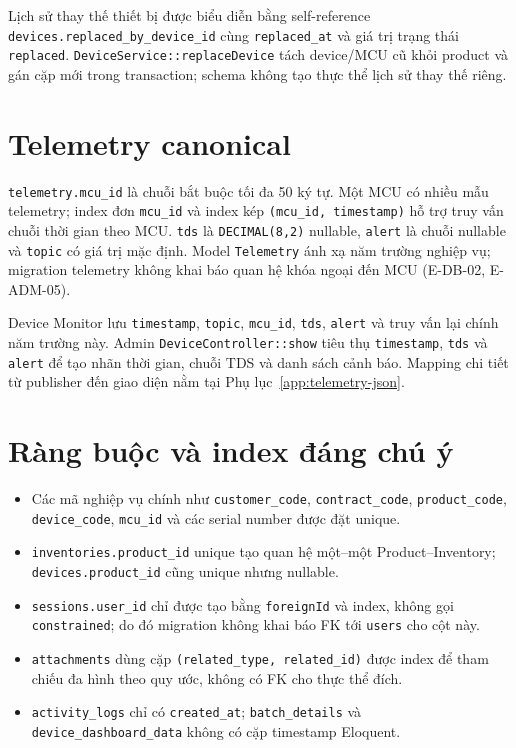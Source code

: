 Lịch sử thay thế thiết bị được biểu diễn bằng self-reference
\texttt{devices.replaced\_by\_device\_id} cùng \texttt{replaced\_at} và giá trị
trạng thái \texttt{replaced}. \texttt{DeviceService::replaceDevice} tách device/MCU cũ
khỏi product và gán cặp mới trong transaction; schema không tạo thực thể
lịch sử thay thế riêng.

\section{Telemetry canonical}

\texttt{telemetry.mcu\_id} là chuỗi bắt buộc tối đa 50 ký tự. Một MCU có
nhiều mẫu telemetry; index đơn \texttt{mcu\_id} và index kép
\texttt{(mcu\_id, timestamp)} hỗ trợ truy vấn chuỗi thời gian theo MCU.
\texttt{tds} là \texttt{DECIMAL(8,2)} nullable, \texttt{alert} là chuỗi
nullable và \texttt{topic} có giá trị mặc định. Model \texttt{Telemetry}
ánh xạ năm trường nghiệp vụ; migration telemetry không khai báo quan hệ khóa
ngoại đến MCU (E-DB-02, E-ADM-05).

Device Monitor lưu \texttt{timestamp}, \texttt{topic}, \texttt{mcu\_id},
\texttt{tds}, \texttt{alert} và truy vấn lại chính năm trường này.
Admin \texttt{DeviceController::show} tiêu thụ \texttt{timestamp}, \texttt{tds}
và \texttt{alert} để tạo nhãn thời gian, chuỗi TDS và danh sách cảnh báo.
Mapping chi tiết từ publisher đến giao diện nằm tại
Phụ lục~\ref{app:telemetry-json}.

\section{Ràng buộc và index đáng chú ý}

\begin{itemize}
  \item Các mã nghiệp vụ chính như \texttt{customer\_code},
  \texttt{contract\_code}, \texttt{product\_code}, \texttt{device\_code},
  \texttt{mcu\_id} và các serial number được đặt unique.
  \item \texttt{inventories.product\_id} unique tạo quan hệ một--một
  Product--Inventory; \texttt{devices.product\_id} cũng unique nhưng nullable.
  \item \texttt{sessions.user\_id} chỉ được tạo bằng \texttt{foreignId}
  và index, không gọi \texttt{constrained}; do đó migration không khai báo FK
  tới \texttt{users} cho cột này.
  \item \texttt{attachments} dùng cặp
  \texttt{(related\_type, related\_id)} được index để tham chiếu đa hình
  theo quy ước, không có FK cho thực thể đích.
  \item \texttt{activity\_logs} chỉ có \texttt{created\_at};
  \texttt{batch\_details} và \texttt{device\_dashboard\_data} không có
  cặp timestamp Eloquent.
\end{itemize}

